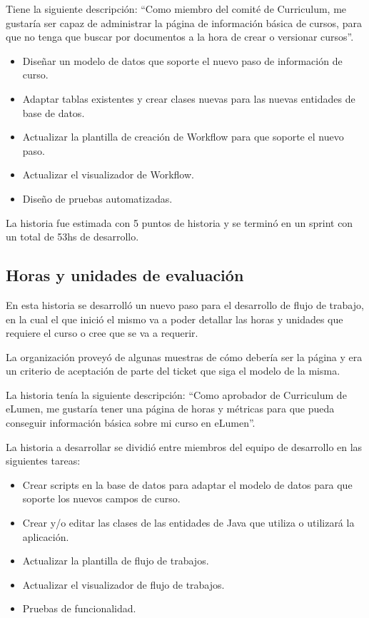 Tiene la siguiente descripción: “Como miembro del comité de Curriculum, me gustaría ser capaz de administrar la página de información básica de cursos, para que no tenga que buscar por documentos a la hora de crear o versionar cursos”.

\begin{itemize}
	\item Diseñar un modelo de datos que soporte el nuevo paso de información de curso.
	\item Adaptar tablas existentes y crear clases nuevas para las nuevas entidades de base de datos.
	\item Actualizar la plantilla de creación de Workflow para que soporte el nuevo paso.
	\item Actualizar el visualizador de Workflow.
	\item Diseño de pruebas automatizadas.
\end{itemize}

La historia fue estimada con 5 puntos de historia y se terminó en un sprint con un total de 53hs de desarrollo.

\subsection{Horas y unidades de evaluación}
En esta historia se desarrolló un nuevo paso para el desarrollo de flujo de trabajo, en la cual el que inició el mismo va a poder detallar las horas y unidades que requiere el curso o cree que se va a requerir.

La organización proveyó de algunas muestras de cómo debería ser la página y era un criterio de aceptación de parte del ticket que siga el modelo de la misma.

La historia tenía la siguiente descripción: “Como aprobador de Curriculum de eLumen, me gustaría tener una página de horas y métricas para que pueda conseguir información básica sobre mi curso en eLumen”.

La historia a desarrollar se dividió entre miembros del equipo de desarrollo en las siguientes tareas:
\begin{itemize}
	\item Crear scripts en la base de datos para adaptar el modelo de datos para que soporte los nuevos campos de curso.
	\item Crear y/o editar las clases de las entidades de Java que utiliza o utilizará la aplicación.
	\item Actualizar la plantilla de flujo de trabajos.
	\item Actualizar el visualizador de flujo de trabajos.
	\item Pruebas de funcionalidad.
\end{itemize}

